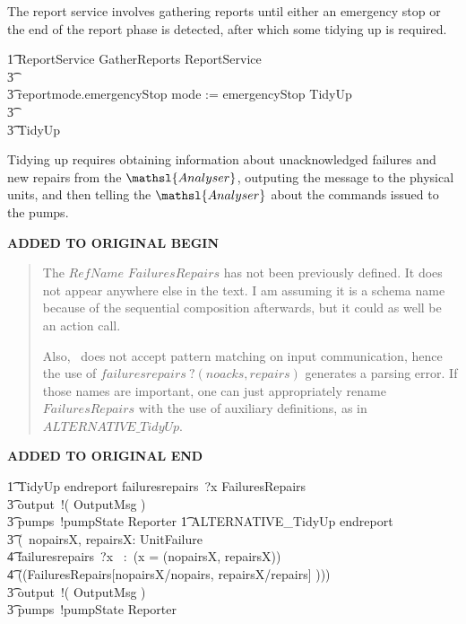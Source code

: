\documentclass{report}
\newenvironment{addedstuff}{\begin{flushleft}\textbf{ADDED TO ORIGINAL BEGIN}\begin{quote}\begin{minipage}{.8\textwidth}}{\end{minipage}\end{quote}\textbf{ADDED TO ORIGINAL END}\end{flushleft}}
\newcommand{\lschexpract}{\left(\!\!\left(}
\newcommand{\rschexpract}{\right)\!\!\right)}
\newcommand{\prefixcolon}{~:~}
\begin{document}
The report service involves gathering reports until either an
emergency stop or the end of the report phase is detected, after which
some tidying up is required.
\begin{circusaction}
    \t1 ReportService \circdef GatherReports \circseq ReportService
        \\
        \t3 \extchoice  %
        \\ %
        \t3 reportmode.emergencyStop \then mode := emergencyStop \circseq TidyUp
        \\ %
        \t3 \extchoice %
        \\ %
        \t3 TidyUp
\end{circusaction}
Tidying up requires obtaining information about unacknowledged
failures and new repairs from the \( \mathsl{Analyser}\), outputing
the message to the physical units, and then telling the \(
\mathsl{Analyser} \) about the commands issued to the pumps.
%
\begin{addedstuff}
   The $RefName$ $FailuresRepairs$ has not been previously defined.
   It does not appear anywhere else in the text. I am assuming it is
   a schema name because of the sequential composition afterwards, but
   it could as well be an action call.

   Also, \Circus\ does not accept pattern matching on input communication,
   hence the use of $failuresrepairs~?(noacks,repairs)$ generates a parsing error.
   If those names are important, one can just appropriately rename $FailuresRepairs$
   with the use of auxiliary definitions, as in $ALTERNATIVE\_TidyUp$.
\end{addedstuff}
%
\begin{circusaction}
    \t1 TidyUp \circdef endreport \then failuresrepairs~?x \then FailuresRepairs \circseq \\
        \t3 output~!( \theta OutputMsg ) \then \\
        \t3 pumps~!pumpState \then Reporter
    \also
    \t1 ALTERNATIVE\_TidyUp \circdef endreport \then \\
    \t3 (\circvar\ nopairsX, repairsX: \power UnitFailure \circspot \\
        \t4 failuresrepairs~?x \prefixcolon (x = (nopairsX, repairsX)) \then \\
        \t4 \lschexpract FailuresRepairs[nopairsX/nopairs, repairsX/repairs] \rschexpract ) \circseq \\
    \t3 output~!( \theta OutputMsg ) \then \\
    \t3 pumps~!pumpState \then Reporter
\end{circusaction}
\end{document}
